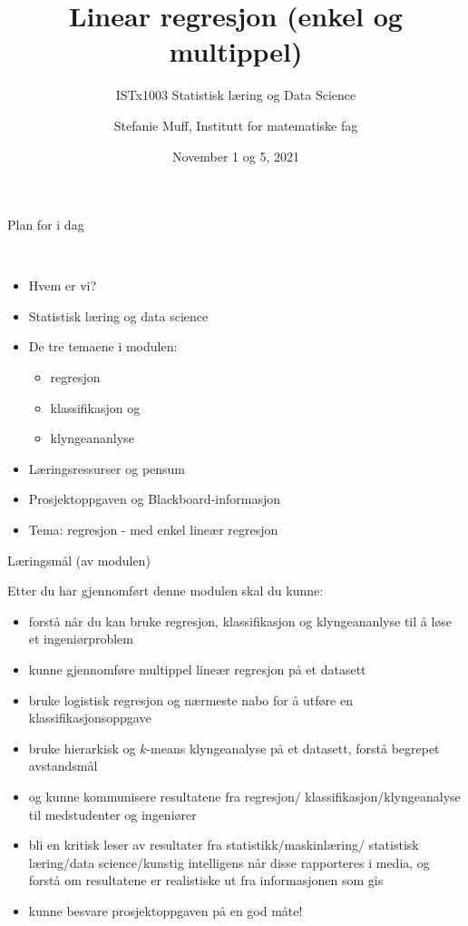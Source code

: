 \documentclass[10pt,ignorenonframetext,]{beamer}
\title{Linear regresjon (enkel og multippel)}
\subtitle{ISTx1003 Statistisk læring og Data Science}
\author{Stefanie Muff, Institutt for matematiske fag}
\date{November 1 og 5, 2021}
\providecommand{\tightlist}{%
  \setlength{\itemsep}{0pt}\setlength{\parskip}{0pt}}
\begin{document}
\frame{\titlepage}

\begin{frame}{Plan for i dag}
\protect\hypertarget{plan-for-i-dag}{}

\(~\)

\begin{itemize}
\item
  Hvem er vi?
\item
  Statistisk læring og data science
\item
  De tre temaene i modulen:

  \begin{itemize}
  \tightlist
  \item
    regresjon
  \item
    klassifikasjon og
  \item
    klyngeananlyse
  \end{itemize}
\item
  Læringsressurser og pensum
\item
  Prosjektoppgaven og Blackboard-informasjon
\item
  Tema: regresjon - med enkel lineær regresjon
\end{itemize}

\end{frame}

\begin{frame}{Læringsmål (av modulen)}
\protect\hypertarget{luxe6ringsmuxe5l-av-modulen}{}

Etter du har gjennomført denne modulen skal du kunne:

\begin{itemize}
\item
  forstå når du kan bruke regresjon, klassifikasjon og klyngeananlyse
  til å løse et ingeniørproblem
\item
  kunne gjennomføre multippel lineær regresjon på et datasett
\item
  bruke logistisk regresjon og nærmeste nabo for å utføre en
  klassifikasjonsoppgave
\item
  bruke hierarkisk og \(k\)-means klyngeanalyse på et datasett, forstå
  begrepet avstandsmål
\item
  og kunne kommunisere resultatene fra regresjon/
  klassifikasjon/klyngeanalyse til medstudenter og ingeniører
\item
  bli en kritisk leser av resultater fra statistikk/maskinlæring/
  statistisk læring/data science/kunstig intelligens når disse
  rapporteres i media, og forstå om resultatene er realistiske ut fra
  informasjonen som gis
\item
  kunne besvare prosjektoppgaven på en god måte!
\end{itemize}

\end{frame}
\end{document}
